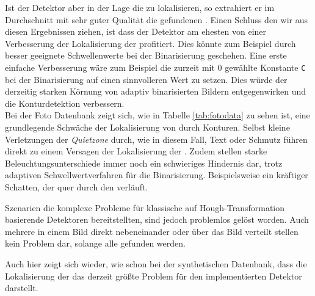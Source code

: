 Ist der Detektor aber in der Lage die \fps zu lokalisieren, so extrahiert er im Durchschnitt mit sehr guter Qualität die gefundenen \QRCodes.
Einen Schluss den wir aus diesen Ergebnissen ziehen, ist dass der Detektor am ehesten von einer Verbesserung der Lokalisierung der \fps profitiert. Dies könnte zum Beispiel durch besser geeignete Schwellenwerte bei der Binarisierung geschehen. Eine erste einfache Verbesserung wäre zum Beispiel die zurzeit mit $0$ gewählte Konstante \texttt{C} bei der Binarisierung auf einen sinnvolleren Wert zu setzen. Dies würde der derzeitig starken Körnung von adaptiv binarisierten Bildern entgegenwirken und die Konturdetektion verbessern.
\\
Bei der Foto Datenbank zeigt sich, wie in Tabelle \ref{tab:fotodata} zu sehen ist, eine grundlegende Schwäche der Lokalisierung von \fps durch Konturen. Selbst kleine Verletzungen der \emph{Quietzone} durch, wie in diesem Fall, Text oder Schmutz führen direkt zu einem Versagen der Lokalisierung der \fps. Zudem stellen starke Beleuchtungsunterschiede immer noch ein schwieriges Hindernis dar, trotz adaptiven Schwellwertverfahren für die Binarisierung. Beispielsweise ein kräftiger Schatten, der quer durch den \QRCode verläuft.

Szenarien die komplexe Probleme für klassische auf Hough-Transformation basierende Detektoren bereitstellten, sind jedoch problemlos gelöst worden. Auch mehrere \QRCodes in einem Bild direkt nebeneinander oder über das Bild verteilt stellen kein Problem dar, solange alle \fps gefunden werden.

Auch hier zeigt sich wieder, wie schon bei der synthetischen Datenbank, dass die Lokalisierung der \fps das derzeit größte Problem für den implementierten Detektor darstellt.
